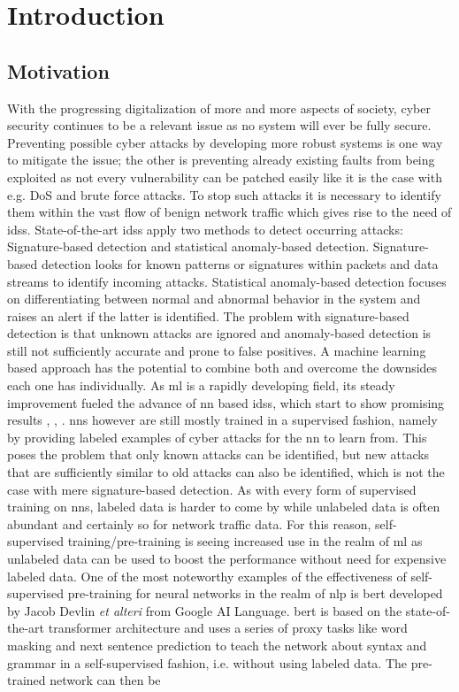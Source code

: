 \chapter{Introduction}

\section{Motivation} \label{sect.motivation}

With the progressing digitalization of more and more aspects of society, cyber security continues to be a relevant issue as no system will ever be fully secure. Preventing possible cyber attacks by developing more robust systems is one way to mitigate the issue; the other is preventing already existing faults from being exploited as not every vulnerability can be patched easily like it is the case with e.g. DoS and brute force attacks. To stop such attacks it is necessary to identify them within the vast flow of benign network traffic which gives rise to the need of \glspl{ids}. State-of-the-art \glspl{ids} apply two methods to detect occurring attacks: Signature-based detection and statistical anomaly-based detection. Signature-based detection looks for known patterns or signatures within packets and data streams to identify incoming attacks. Statistical anomaly-based detection focuses on differentiating between normal and abnormal behavior in the system and raises an alert if the latter is identified. The problem with signature-based detection is that unknown attacks are ignored and anomaly-based detection is still not sufficiently accurate and prone to false positives. A machine learning based approach has the potential to combine both and overcome the downsides each one has individually. As \gls{ml} is a rapidly developing field, its steady improvement fueled the advance of \gls{nn} based \glspl{ids}, which start to show promising results \cite{fog_based_detection_survey_2020}, \cite{kitsune}, \cite{ml_ids_survey}. \glspl{nn} however are still mostly trained in a supervised fashion, namely by providing labeled examples of cyber attacks for the \gls{nn} to learn from. This poses the problem that only known attacks can be identified, but new attacks that are sufficiently similar to old attacks can also be identified, which is not the case with mere signature-based detection. As with every form of supervised training on \glspl{nn}, labeled data is harder to come by while unlabeled data is often abundant and certainly so for network traffic data. For this reason, self-supervised training/pre-training is seeing increased use in the realm of \gls{ml} as unlabeled data can be used to boost the performance without need for expensive labeled data. One of the most noteworthy examples of the effectiveness of self-supervised pre-training for neural networks in the realm of \gls{nlp} is \gls{bert} \cite{bert} developed by Jacob Devlin \textit{et alteri} from Google AI Language. \gls{bert} is based on the state-of-the-art transformer architecture \cite{attention} and uses a series of proxy tasks like word masking and next sentence prediction to teach the network about syntax and grammar in a self-supervised fashion, i.e. without using labeled data. The pre-trained network can then be 